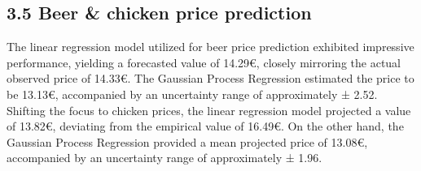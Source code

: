 \documentclass{article}
\theoremstyle{plain}
\theoremstyle{definition}
\theoremstyle{remark}
\begin{document}
\subsection*{3.5 Beer \& chicken price prediction}
The linear regression model utilized for beer price prediction exhibited impressive performance, yielding a forecasted value of 14.29€, closely mirroring the actual observed price of 14.33€. The Gaussian Process Regression estimated the price to be 13.13€, accompanied by an uncertainty range of approximately ± 2.52.
Shifting the focus to chicken prices, the linear regression model projected a value of 13.82€, deviating from the empirical value of 16.49€. On the other hand, the Gaussian Process Regression provided a mean projected price of 13.08€, accompanied by an uncertainty range of approximately ± 1.96.
\end{document}
